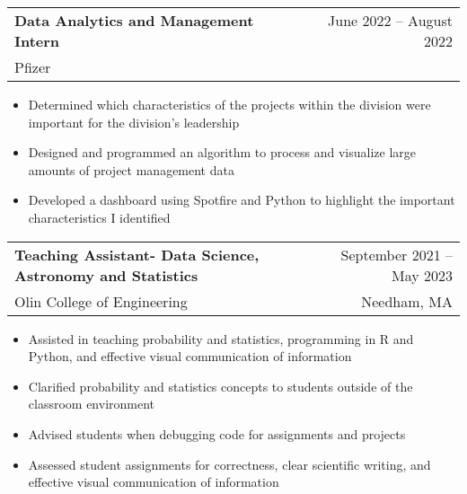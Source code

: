 \documentclass[letterpaper,10pt]{article}
\makeatletter
\newcommand{\resumeItem}[1]{
  \item\small{
    {#1\vspace{-2pt}}
  }
}
\newcommand{\resumeSubheading}[4]{
  \vspace{-2pt}\item
    \begin{tabular*}{0.97\textwidth}[t]{l@{\extracolsep{\fill}}r}
      \textbf{#1} & #2 \\
      \small#3 & \small #4 \\
    \end{tabular*}\vspace{-7pt}
}
\newcommand{\resumeSubSubheading}[2]{
    \item
    \begin{tabular*}{0.97\textwidth}{l@{\extracolsep{\fill}}r}
      \textit{\small#1} & \textit{\small #2} \\
    \end{tabular*}\vspace{-7pt}
}
\newcommand{\resumeSubHeadingListEnd}{\end{itemize}}
\newcommand{\resumeItemListStart}{\begin{itemize}}
\newcommand{\resumeItemListEnd}{\end{itemize}\vspace{-5pt}}
\makeatother
\begin{document}
  
    \resumeSubheading
      {Data Analytics and Management Intern}{June 2022 -- August 2022}
      {Pfizer}{}
      \resumeItemListStart
        \resumeItem{Determined which characteristics of the projects within the division were important for the division's leadership}
        \resumeItem{Designed and programmed an algorithm to process and visualize large amounts of project management data}
        \resumeItem{Developed a dashboard using Spotfire and Python to highlight the important characteristics I identified}
      \resumeItemListEnd
      



    \resumeSubheading
      {Teaching Assistant- Data Science, Astronomy and Statistics}{September 2021 -- May 2023}
      {Olin College of Engineering}{Needham, MA}
      \resumeItemListStart
        \resumeItem{Assisted in teaching probability and statistics, programming in R and Python, and effective visual communication of information}
        \resumeItem{Clarified probability and statistics concepts to students outside of the classroom environment}
        \resumeItem{Advised students when debugging code for assignments and projects}
        \resumeItem{Assessed student assignments for correctness, clear scientific writing, and effective visual communication of information}
    \resumeItemListEnd
\end{document}
